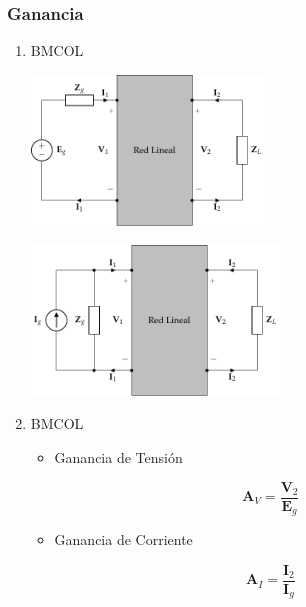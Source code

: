 \subsubsection{Ganancia}
\label{sec:orge1f4b88}

\begin{enumerate}
\item \hfill{}\textsc{BMCOL}
\label{sec:org1a393ee}
\begin{center}
\includegraphics[height=4cm]{../figs/cuadripolo_cargado_fuente_tension.pdf}
\end{center}
\begin{center}
\includegraphics[height=4cm]{../figs/cuadripolo_cargado_fuente_corriente.pdf}
\end{center}


\item \hfill{}\textsc{BMCOL}
\label{sec:org77ac402}
\begin{itemize}
\item Ganancia de Tensión
\end{itemize}
\[
\mathbf{A}_V = \frac{\mathbf{V}_2}{\mathbf{E}_g}
\]
\begin{itemize}
\item Ganancia de Corriente
\end{itemize}
\[
\mathbf{A}_I = \frac{\mathbf{I}_2}{\mathbf{I}_g}
\]
\end{enumerate}

